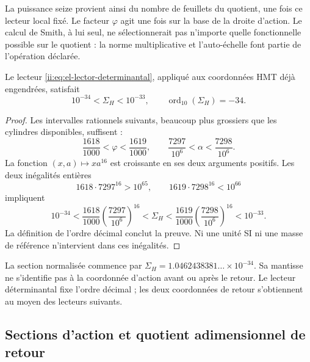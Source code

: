 La puissance seize provient ainsi du nombre de feuillets du quotient, une
fois ce lecteur local fixé. Le facteur \(\varphi\) agit une fois sur
la base de la droite d'action. Le calcul de Smith, à lui seul, ne
sélectionnerait pas n'importe quelle fonctionnelle possible sur le quotient : la norme
multiplicative et l'auto-échelle font partie de l'opération déclarée.

\begin{theorem}
Le lecteur \eqref{ii:eq:el-lector-determinantal}, appliqué aux coordonnées
HMT déjà engendrées, satisfait
\begin{equation}
 10^{-34}<\Sigma_H<10^{-33},\qquad
 \operatorname{ord}_{10}(\Sigma_H)=-34.
 \label{ii:eq:el-decada}
\end{equation}
\end{theorem}
\begin{proof}
Les intervalles rationnels suivants, beaucoup plus grossiers que les cylindres
disponibles, suffisent :
\[
 \frac{1618}{1000}<\varphi<\frac{1619}{1000},\qquad
 \frac{7297}{10^6}<\alpha<\frac{7298}{10^6}.
\]
La fonction \((x,a)\mapsto xa^{16}\) est croissante en ses deux arguments
positifs. Les deux inégalités entières
\[
 1618\cdot7297^{16}>10^{65},\qquad
 1619\cdot7298^{16}<10^{66}
\]
impliquent
\[
 10^{-34}
 <\frac{1618}{1000}\left(\frac{7297}{10^6}\right)^{16}
 <\Sigma_H
 <\frac{1619}{1000}\left(\frac{7298}{10^6}\right)^{16}
 <10^{-33}.
\]
La définition de l'ordre décimal conclut la preuve. Ni une
unité SI ni une masse de référence n'intervient dans ces inégalités.
\end{proof}

La section normalisée commence par
\(\Sigma_H=1.0462438381\ldots\times10^{-34}\). Sa mantisse ne
s'identifie pas à la coordonnée d'action avant ou après le retour.
Le lecteur déterminantal fixe l'ordre décimal ; les deux coordonnées de
retour s'obtiennent au moyen des lecteurs suivants.


\subsection{Sections d'action et quotient adimensionnel de retour}

